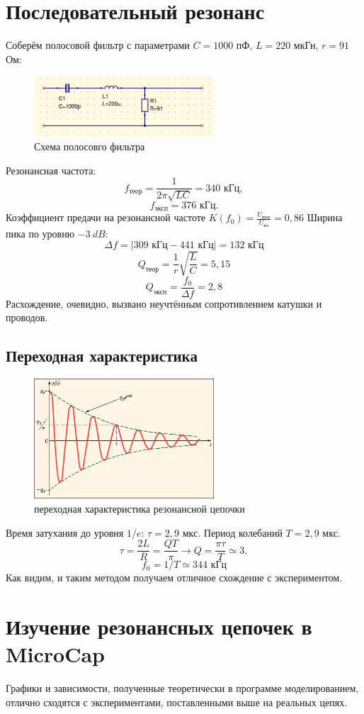 \documentclass[a4paper, 12pt]{article}
\begin{document}
\section*{Последовательный резонанс}
Соберём полосовой фильтр с параметрами $C=1000$ пФ, $L = 220$ мкГн, $ r = 91$ Ом:
\begin{figure}[H]
\centering
\includegraphics[width=0.6\textwidth]{polfil}
\caption{Схема полосовго фильтра}
\end{figure}
Резонансная частота:
$$f_\text{теор} = \frac{1}{2\pi \sqrt{LC}} = 340 \text{ кГц},$$
$$f_\text{эксп} = 376 \text{ кГц}.$$
Коэффициент предачи на резонансной частоте $K(f_0) = \frac{U_\text{вых}}{U_\text{вх}} = 0,86$
Ширина пика по уровню $-3\ dB$:
$$\Delta f = |309 \text{ кГц} - 441 \text{ кГц}| = 132 \text{ кГц}$$
$$Q_\text{теор} = \frac{1}{r}\sqrt{\frac{L}{C}} = 5,15$$
$$Q_\text{эксп} = \frac{f_0}{\Delta f} = 2,8$$
Расхождение, очевидно, вызвано неучтённым сопротивлением катушки и проводов.
\subsection*{Переходная характеристика}
\begin{figure}[H]
\centering
\includegraphics[width=0.6\textwidth]{tranzat}
\caption{переходная характеристика резонансной цепочки}
\end{figure}
Время затухания до уровня $1/e$: $\tau = 2,9$ мкс. Период колебаний $T = 2,9$ мкс.
$$\tau = \frac{2L}{R} = \frac{QT}{\pi} \rightarrow Q = \frac{\pi \tau}{T} \simeq 3,$$
$$f_0 = 1/T \simeq 344 \text{ кГц}$$
Как видим, и таким методом получаем отличное схождение с экспериментом.

\section*{Изучение резонансных цепочек в MicroCap}
Графики и зависимости, полученные теоретически в программе моделированием, отлично сходятся с экспериментами, поставленными выше на реальных цепях. 
\end{document}
